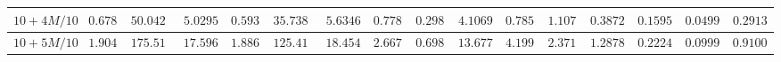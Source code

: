 \begin{landscape}
\begin{tabular}{|c|c|c|c|c|c|c|c|c|c|c|c|c|c|c|c}
$10 + 4M/10$ & $0.6782$                                                        & $50.0426$                                                       & $5.0295$                                                          & $0.5933$                                                           & $35.7385$                                                             & $5.6346$                                                        & $0.7788$                                                          & $0.2985$                                                           & $4.1069$                                                              & $0.7851$                                                        & $1.1070$                                                          & $0.38727$                                                        & $0.15959$                                                          & $0.04999$                                                           & \multicolumn{1}{c|}{$0.2913$}                                                              \\ \hline
$10 + 5M/10$ & $1.9042$                                                        & $175.5118$                                                      & $17.5965$                                                         & $1.8867$                                                           & $125.4128$                                                            & $18.4547$                                                       & $2.6678$                                                          & $0.6985$                                                           & $13.6777$                                                             & $4.1991$                                                        & $2.3710$                                                          & $1.28788$                                                        & $0.22248$                                                          & $0.09994$                                                           & \multicolumn{1}{c|}{$0.91002$}                                                              \\ \hline

\end{tabular}
\end{landscape}
